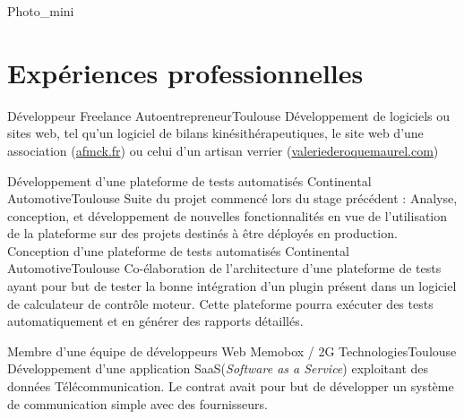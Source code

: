 \documentclass{my_cv_bis}
\begin{document}
 {
}{Photo_mini}

 \vspace{-5mm}
\section{Expériences professionnelles}
	{Développeur Freelance}
	{Autoentrepreneur}{Toulouse}
	{
	Développement de logiciels ou sites web, tel qu'un logiciel de bilans kinésithérapeutiques, le site web d'une association (\url{afmck.fr})
	ou celui d'un artisan verrier (\url{valeriederoquemaurel.com})
	}
	{}

	{Développement d'une plateforme de tests automatisés}
	{Continental Automotive}{Toulouse}
	{
	Suite du projet commencé lors du stage précédent : Analyse, conception, et développement de nouvelles fonctionnalités en vue de l'utilisation
	de la plateforme sur des projets destinés à être déployés en production. 
	}
	{}
	{Conception d'une plateforme de tests automatisés}
	{Continental Automotive}{Toulouse}
	{
	Co-élaboration de l'architecture d'une plateforme de tests ayant pour but de tester la bonne intégration d'un plugin présent dans un logiciel de
	calculateur de contrôle moteur. Cette plateforme pourra exécuter des tests automatiquement et en générer des rapports détaillés.
	}
	{}

	{ Membre d'une équipe de développeurs Web}
	{Memobox / 2G Technologies}{Toulouse}
	{Développement d'une application SaaS(\textit{Software as a Service}) exploitant des données Télécommunication. Le contrat avait pour but de développer un système de
	communication simple avec des fournisseurs.} {}
\end{document}

